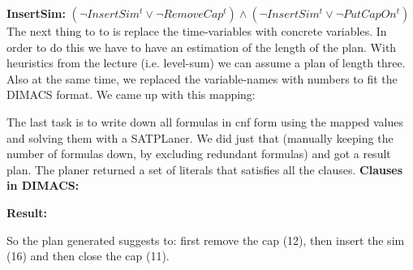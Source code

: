 \documentclass[11pt]{article}
\begin{document}
\noindent \textbf{InsertSim:}\newline
$
(\neg InsertSim^{t} \vee \neg RemoveCap^{t}) \wedge (\neg InsertSim^{t} \vee \neg PutCapOn^{t})
$\newline
\newpage\noindent
The next thing to to is replace the time-variables with concrete variables. In order to do this we have to have an estimation of the length of the plan. With heuristics from the lecture (i.e. level-sum) we can assume a plan of length three. Also at the same time, we replaced the variable-names with numbers to fit the DIMACS format. We came up with this mapping:

The last task is to write down all formulas in cnf form using the mapped values and solving them with a SATPLaner. We did just that (manually keeping the number of formulas down, by excluding redundant formulas) and got a result plan. The planer returned a set of literals that satisfies all the clauses.
\newpage
\noindent
\textbf{Clauses in DIMACS:}

\newpage
\textbf{Result:}

So the plan generated suggests to: first remove the cap (12), then insert the sim (16) and then close the cap (11). 
\end{document}
